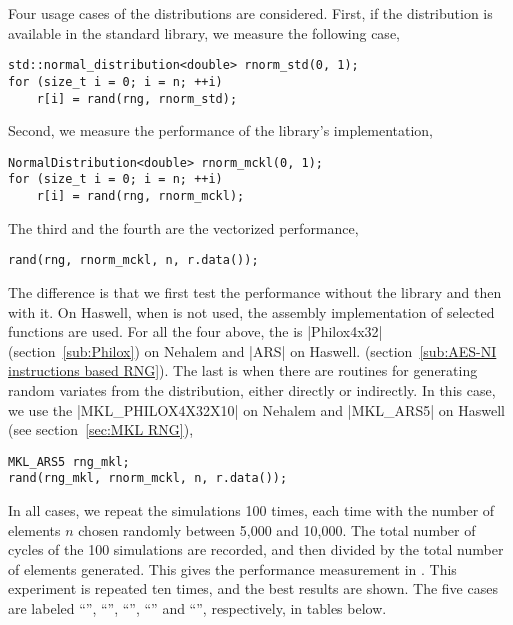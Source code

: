 Four usage cases of the distributions are considered. First, if the
distribution is available in the standard library, we measure the following
case,
\begin{verbatim}
std::normal_distribution<double> rnorm_std(0, 1);
for (size_t i = 0; i = n; ++i)
    r[i] = rand(rng, rnorm_std);
\end{verbatim}
Second, we measure the performance of the library's implementation,
\begin{verbatim}
NormalDistribution<double> rnorm_mckl(0, 1);
for (size_t i = 0; i = n; ++i)
    r[i] = rand(rng, rnorm_mckl);
\end{verbatim}
The third and the fourth are the vectorized performance,
\begin{verbatim}
rand(rng, rnorm_mckl, n, r.data());
\end{verbatim}
The difference is that we first test the performance without the \mkl \vml
library and then with it. On Haswell, when \mkl \vml is not used, the assembly
implementation of selected functions are used. For all the four above, the \rng
is |Philox4x32| (section~\ref{sub:Philox}) on Nehalem and |ARS| on Haswell.
(section~\ref{sub:AES-NI instructions based RNG}). The last is when there are
\mkl routines for generating random variates from the distribution, either
directly or indirectly. In this case, we use the \rng |MKL_PHILOX4X32X10| on
Nehalem and |MKL_ARS5| on Haswell (see section~\ref{sec:MKL RNG}),
\begin{verbatim}
MKL_ARS5 rng_mkl;
rand(rng_mkl, rnorm_mckl, n, r.data());
\end{verbatim}
In all cases, we repeat the simulations 100 times, each time with the number of
elements $n$ chosen randomly between 5,000 and 10,000. The total number of
cycles of the 100 simulations are recorded, and then divided by the total
number of elements generated. This gives the performance measurement in \cpe.
This experiment is repeated ten times, and the best results are shown. The five
cases are labeled ``\std'', ``\mckl'', ``\vmf'', ``\vml'' and ``\mkl'',
respectively, in tables below.





